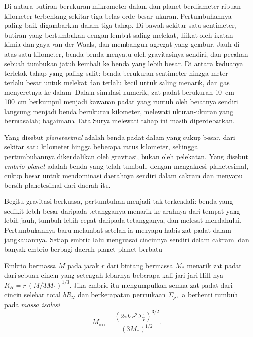 Di antara butiran berukuran mikrometer dalam  dan planet berdiameter ribuan
kilometer terbentang sekitar tiga belas orde besar ukuran. Pertumbuhannya paling baik
digambarkan dalam tiga tahap. Di bawah sekitar satu sentimeter, butiran yang bertumbukan
dengan lembut saling melekat, diikat oleh ikatan kimia dan gaya van der Waals, dan membangun
agregat yang gembur. Jauh di atas satu kilometer, benda-benda menyatu oleh gravitasinya sendiri,
dan pecahan sebuah tumbukan jatuh kembali ke benda yang lebih besar. Di antara keduanya
terletak tahap yang paling sulit: benda berukuran sentimeter hingga meter terlalu besar untuk
melekat dan terlalu kecil untuk saling menarik, dan gas menyeretnya ke dalam. Dalam
simulasi numerik, zat padat berukuran \qtyrange{10}{100}{cm} berkumpul menjadi kawanan
padat yang runtuh oleh beratnya sendiri langsung menjadi benda berukuran kilometer,
melewati ukuran-ukuran yang bermasalah; bagaimana Tata Surya melewati tahap ini
masih diperdebatkan.

\begin{definition}
\label{def:b2:planet-formation-meteorites:planetesimal}
Yang disebut \emph{planetesimal} adalah benda padat dalam  yang cukup besar, dari sekitar satu kilometer hingga beberapa ratus kilometer,
sehingga pertumbuhannya dikendalikan oleh gravitasi, bukan oleh pelekatan. Yang disebut
\emph{embrio planet} adalah benda yang telah tumbuh, dengan
mengakresi planetesimal, cukup besar untuk mendominasi daerahnya sendiri dalam cakram dan
menyapu bersih planetesimal dari daerah itu.
\end{definition}

Begitu gravitasi berkuasa, pertumbuhan menjadi tak terkendali: benda yang sedikit lebih besar
daripada tetangganya menarik  ke arahnya dari tempat yang lebih jauh, tumbuh lebih
cepat daripada tetangganya, dan melesat mendahului. Pertumbuhannya baru melambat setelah ia menyapu
habis zat padat dalam jangkauannya. Setiap embrio lalu menguasai cincinnya sendiri dalam cakram,
dan banyak embrio berbagi daerah planet-planet berbatu.

\begin{proposition}\label{prop:b2:planet-formation-meteorites:isolation}
Embrio bermassa $M$ pada jarak $r$ dari bintang bermassa $M_*$ menarik
zat padat dari sebuah cincin yang setengah lebarnya beberapa kali jari-jari Hill-nya
$R_H = r\,(M/3M_*)^{1/3}$. Jika embrio itu mengumpulkan semua zat padat dari cincin selebar total
$bR_H$ dan berkerapatan permukaan $\Sigma_p$, ia berhenti tumbuh pada
\emph{massa isolasi}
\[
  M_{\mathrm{iso}} = \frac{(2\pi b\, r^2 \Sigma_p)^{3/2}}{(3M_*)^{1/2}} .
\]
\end{proposition}


